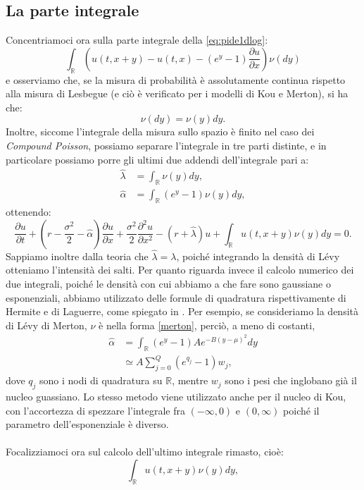 \documentclass[a4paper,10pt]{report}
\newcommand{\der}[2]{\frac{\partial #1}{\partial #2}}
\newcommand{\dder}[2]{\frac{\partial^2 #1}{\partial #2^2}}
\theoremstyle{plain}
\theoremstyle{definition}
\theoremstyle{remark}
\begin{document}
\subsection{La parte integrale}
Concentriamoci ora sulla parte integrale della \ref{eq:pide1dlog}:$$\int_\mathbb{R}\left(u(t,x+y)-u(t,x)-(e^y-1)\der{u}{x}\right)\nu(dy)$$e osserviamo che, se la misura di probabilità è assolutamente continua rispetto alla misura di Lesbegue (e ci\`o \`e verificato per i modelli di Kou e Merton), si ha che:$$\nu(dy)=\nu(y)dy.$$ Inoltre, siccome l'integrale della misura sullo spazio è finito nel caso dei \emph{Compound Poisson}, possiamo separare l'integrale in tre parti distinte, e in particolare possiamo porre gli ultimi due addendi dell'integrale pari a:
\begin{align*}
\hat{\lambda}&=\int_{\mathbb{R}}\nu(y)dy,\\
\hat{\alpha}&=\int_{\mathbb{R}}(e^y-1)\nu(y)dy,
\end{align*}
ottenendo: $$\der{u}{t}+\left(r-\frac{\sigma^2}{2}-\hat{\alpha}\right)\der{u}{x}+\frac{\sigma^2}{2}\dder{u}{x}-(r+\hat{\lambda})u+\int_\mathbb{R}u(t,x+y)\nu(y)dy=0.$$
Sappiamo inoltre dalla teoria che $\hat{\lambda}=\lambda$, poich\'e integrando la densit\`a di L\'evy otteniamo l'intensit\`a dei salti. Per quanto riguarda invece il calcolo numerico dei due integrali, poich\'e le densit\`a con cui abbiamo a che fare sono gaussiane o esponenziali, abbiamo utilizzato delle formule di quadratura rispettivamente di Hermite e di Laguerre, come spiegato in \cite{qss2007}. Per esempio, se consideriamo la densit\`a di L\'evy di Merton, $\nu$ \`e nella forma \ref{merton}, perci\`o, a meno di costanti,
\begin{align*}
\hat{\alpha}&=\int_{\mathbb{R}}(e^y-1)Ae^{-B(y-\mu)^2}dy\\
&\simeq A\sum_{j=0}^{Q}(e^{q_j}-1)w_j,
\end{align*}
dove $q_j$ sono i nodi di quadratura su $\mathbb{R}$, mentre $w_j$ sono i pesi che inglobano gi\`a il nucleo guassiano. Lo stesso metodo viene utilizzato anche per il nucleo di Kou, con l'accortezza di spezzare l'integrale fra $(-\infty,0)$ e $(0,\infty)$ poich\'e il parametro dell'esponenziale \`e diverso.\\\\Focalizziamoci ora sul calcolo dell'ultimo integrale rimasto, cio\`e:
\begin{equation}
\int_\mathbb{R}u(t,x+y)\nu(y)dy,
\label{intnonlocal}
\end{equation}
\end{document}
